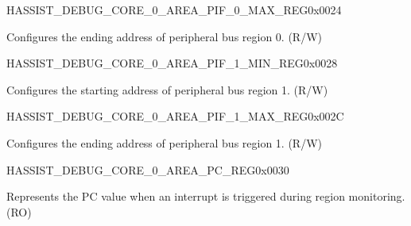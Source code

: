 \begin{register}{H}{ASSIST\_DEBUG\_CORE\_0\_AREA\_PIF\_0\_MAX\_REG}{0x0024}\label{regdesc:ASSISTDEBUGCORE0AREAPIF0MAXREG}
%
\regnewline%
\begin{regdesc}\begin{reglist}
\label{fielddesc:ASSISTDEBUGCORE0AREAPIF0MAX}\item [ASSIST\_DEBUG\_CORE\_0\_AREA\_PIF\_0\_MAX] Configures the ending address of peripheral bus region 0. (R/W)
\end{reglist}\end{regdesc}
\end{register}


\begin{register}{H}{ASSIST\_DEBUG\_CORE\_0\_AREA\_PIF\_1\_MIN\_REG}{0x0028}\label{regdesc:ASSISTDEBUGCORE0AREAPIF1MINREG}
%
\regnewline%
\begin{regdesc}\begin{reglist}
\label{fielddesc:ASSISTDEBUGCORE0AREAPIF1MIN}\item [ASSIST\_DEBUG\_CORE\_0\_AREA\_PIF\_1\_MIN] Configures the starting address of peripheral bus region 1. (R/W)
\end{reglist}\end{regdesc}
\end{register}


\begin{register}{H}{ASSIST\_DEBUG\_CORE\_0\_AREA\_PIF\_1\_MAX\_REG}{0x002C}\label{regdesc:ASSISTDEBUGCORE0AREAPIF1MAXREG}
%
\regnewline%
\begin{regdesc}\begin{reglist}
\label{fielddesc:ASSISTDEBUGCORE0AREAPIF1MAX}\item [ASSIST\_DEBUG\_CORE\_0\_AREA\_PIF\_1\_MAX] Configures the ending address of peripheral bus region 1. (R/W)
\end{reglist}\end{regdesc}
\end{register}


\begin{register}{H}{ASSIST\_DEBUG\_CORE\_0\_AREA\_PC\_REG}{0x0030}\label{regdesc:ASSISTDEBUGCORE0AREAPCREG}
%
\regnewline%
\begin{regdesc}\begin{reglist}
\label{fielddesc:ASSISTDEBUGCORE0AREAPC}\item [ASSIST\_DEBUG\_CORE\_0\_AREA\_PC] Represents the PC value when an interrupt is triggered during region monitoring. (RO)
\end{reglist}\end{regdesc}
\end{register}



